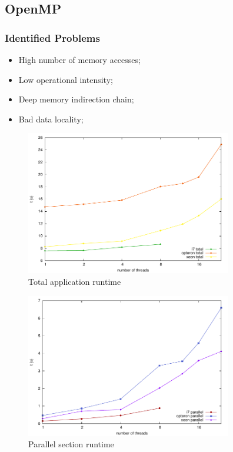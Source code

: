\documentclass{beamer}
\begin{document}
\subsection{OpenMP}

\begin{frame}
	\frametitle{Identified Problems}
	\begin{itemize}
	\item High number of memory accesses;
	\item Low operational intensity;
	\item Deep memory indirection chain;
	\item Bad data locality;
	\end{itemize}
\end{frame}

\begin{frame}	
	\begin{center}

	\begin{figure}[!htp]
		\includegraphics[width=9cm]{../images/total.pdf}
		\caption{Total application runtime}
		\label{fig:roofline}
	\end{figure}
	\end{center}
\end{frame}

\begin{frame}
	\begin{center}
	\begin{figure}[!htp]
		\includegraphics[width=9cm]{../images/parallel.pdf}
		\caption{Parallel section runtime}
		\label{fig:roofline}
	\end{figure}
	\end{center}
\end{frame}
\end{document}

